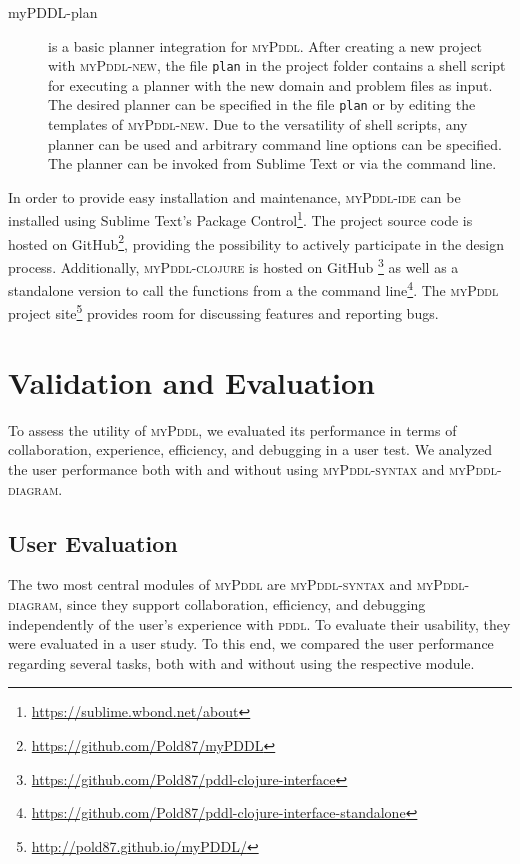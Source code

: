 \documentclass[runningheads]{llncs}
\newcommand{\mypddl}{\textsc{myPddl}\xspace}
\newcommand{\mypddlclojure}{\textsc{myPddl-clojure}\xspace}
\newcommand{\mypddlsyntax}{\textsc{myPddl-syntax}\xspace}
\newcommand{\mypddldiagram}{\textsc{myPddl-diagram}\xspace}
\newcommand{\mypddlnew}{\textsc{myPddl-new}\xspace}
\newcommand{\mypddlide}{\textsc{myPddl-ide}\xspace}
\newcommand{\pddl}{\textsc{pddl}\xspace}
\newcommand{\sublimetext}{Sublime Text\xspace}
\begin{document}
\begin{description}
\item[myPDDL-plan] is a basic planner integration for \mypddl. After
  creating a new project with \mypddlnew, the file \texttt{plan} in
  the project folder contains a shell script for executing a planner
  with the new domain and problem files as input. The desired planner
  can be specified in the file \texttt{plan} or by editing the
  templates of \mypddlnew. Due to the versatility of shell scripts,
  any planner can be used and arbitrary command line options can be
  specified. The planner can be invoked from Sublime Text or via the
  command line.
\end{description}


In order to provide easy installation and maintenance, \mypddlide can
be installed using \sublimetext's Package
Control\footnote{\url{https://sublime.wbond.net/about}}.  The project
source code is hosted on
GitHub\footnote{\url{https://github.com/Pold87/myPDDL}}, providing the
possibility to actively participate in the design
process. Additionally, \mypddlclojure is hosted on GitHub
\footnote{\url{https://github.com/Pold87/pddl-clojure-interface}} as
well as a standalone version to call the functions from a the command
line\footnote{\url{https://github.com/Pold87/pddl-clojure-interface-standalone}}.
The \mypddl project
site\footnote{\url{http://pold87.github.io/myPDDL/}} provides room for
discussing features and reporting bugs.

\section{Validation and Evaluation}
\label{sec:valid-eval}

To assess the utility of \mypddl, we evaluated its performance in
terms of collaboration, experience, efficiency, and debugging in a
user test. We analyzed the user performance both with and without
using \mypddlsyntax and \mypddldiagram.

\subsection{User Evaluation}

The two most central modules of \mypddl are \mypddlsyntax and
\mypddldiagram, since they support collaboration, efficiency, and
debugging independently of the user's experience with \pddl. To
evaluate their usability, they were evaluated in a user study. To this
end, we compared the user performance regarding several tasks, both
with and without using the respective module.
\end{document}
